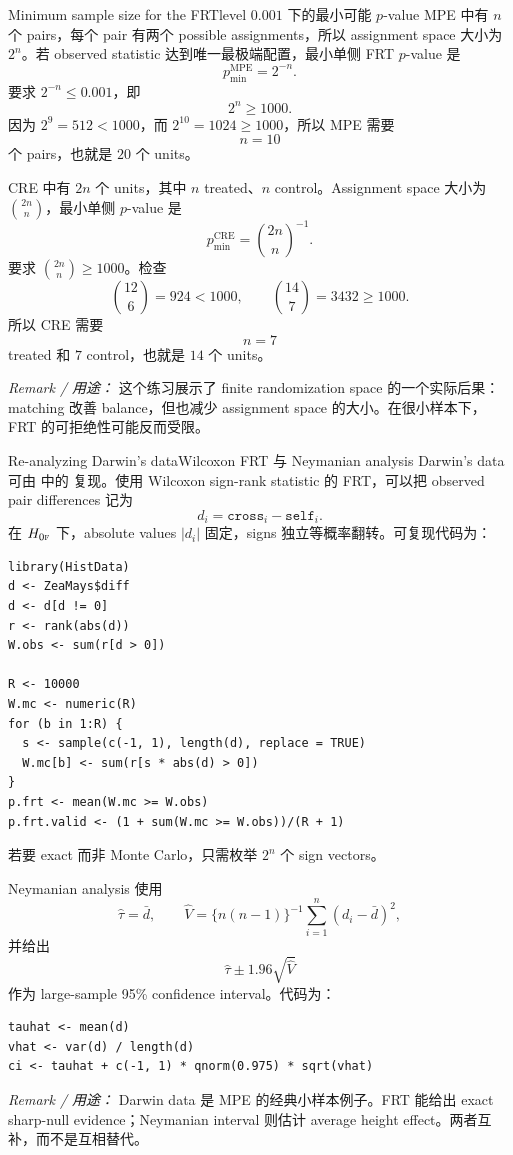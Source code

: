 \begin{exercisesolution}{Minimum sample size for the FRT}{level $0.001$ 下的最小可能 $p$-value}
MPE 中有 $n$ 个 pairs，每个 pair 有两个 possible assignments，所以 assignment space 大小为 $2^n$。若 observed statistic 达到唯一最极端配置，最小单侧 FRT $p$-value 是
\[
p_{\min}^{\mathrm{MPE}}=2^{-n}.
\]
要求 $2^{-n}\leq 0.001$，即
\[
2^n\geq 1000.
\]
因为 $2^9=512<1000$，而 $2^{10}=1024\geq1000$，所以 MPE 需要
\[
n=10
\]
个 pairs，也就是 $20$ 个 units。

CRE 中有 $2n$ 个 units，其中 $n$ treated、$n$ control。Assignment space 大小为 $\binom{2n}{n}$，最小单侧 $p$-value 是
\[
p_{\min}^{\mathrm{CRE}}=\binom{2n}{n}^{-1}.
\]
要求 $\binom{2n}{n}\geq1000$。检查
\[
\binom{12}{6}=924<1000,\qquad
\binom{14}{7}=3432\geq1000.
\]
所以 CRE 需要
\[
n=7
\]
treated 和 $7$ control，也就是 $14$ 个 units。

\emph{Remark / 用途：} 这个练习展示了 finite randomization space 的一个实际后果：matching 改善 balance，但也减少 assignment space 的大小。在很小样本下，FRT 的可拒绝性可能反而受限。
\end{exercisesolution}

\begin{exercisesolution}{Re-analyzing Darwin's data}{Wilcoxon FRT 与 Neymanian analysis}
Darwin's data 可由  中的  复现。使用 Wilcoxon sign-rank statistic 的 FRT，可以把 observed pair differences 记为
\[
d_i=\texttt{cross}_i-\texttt{self}_i.
\]
在 $H_{0\textsc{f}}$ 下，absolute values $|d_i|$ 固定，signs 独立等概率翻转。可复现代码为：
\begin{lstlisting}
library(HistData)
d <- ZeaMays$diff
d <- d[d != 0]
r <- rank(abs(d))
W.obs <- sum(r[d > 0])

R <- 10000
W.mc <- numeric(R)
for (b in 1:R) {
  s <- sample(c(-1, 1), length(d), replace = TRUE)
  W.mc[b] <- sum(r[s * abs(d) > 0])
}
p.frt <- mean(W.mc >= W.obs)
p.frt.valid <- (1 + sum(W.mc >= W.obs))/(R + 1)
\end{lstlisting}
若要 exact 而非 Monte Carlo，只需枚举 $2^n$ 个 sign vectors。

Neymanian analysis 使用
\[
\hat\tau=\bar d,\qquad
\hat V=\{n(n-1)\}^{-1}\sum_{i=1}^n(d_i-\bar d)^2,
\]
并给出
\[
\hat\tau\pm 1.96\sqrt{\hat V}
\]
作为 large-sample 95\% confidence interval。代码为：
\begin{lstlisting}
tauhat <- mean(d)
vhat <- var(d) / length(d)
ci <- tauhat + c(-1, 1) * qnorm(0.975) * sqrt(vhat)
\end{lstlisting}

\emph{Remark / 用途：} Darwin data 是 MPE 的经典小样本例子。FRT 能给出 exact sharp-null evidence；Neymanian interval 则估计 average height effect。两者互补，而不是互相替代。
\end{exercisesolution}

